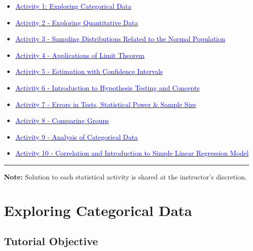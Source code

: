 \documentclass[oneside,openany]{book}
\providecommand{\tightlist}{%
  \setlength{\itemsep}{0pt}\setlength{\parskip}{0pt}}
\begin{document}
\begin{itemize}
\tightlist
\item
  \hyperref[activity-1---exploring-categorical-data]{\textcolor{blue}{Activity 1: Exploring Categorical Data}}
\item
  \hyperref[activity-2---exploring-quantitative-data]{\textcolor{blue}{Activity 2 - Exploring Quantitative Data}}
\item
  \hyperref[activity-3---sampling-distributions-related-to-the-normal-population]{\textcolor{blue}{Activity 3 - Sampling Distributions Related to the Normal Population}}
\item
  \hyperref[activity-4---applications-of-limit-theorem]{\textcolor{blue}{Activity 4 - Applications of Limit Theorem}}
\item
  \hyperref[activity-5---estimation-with-confidence-intervals]{\textcolor{blue}{Activity 5 - Estimation with Confidence Intervals}}
\item
  \hyperref[activity-6---introduction-to-hypothesis-testing-and-concepts]{\textcolor{blue}{Activity 6 - Introduction to Hypothesis Testing and Concepts}}
\item
  \hyperref[activity-7---errors-in-tests-statistical-power--sample-size]{\textcolor{blue}{Activity 7 - Errors in Tests, Statistical Power \& Sample Size}}
\item
  \hyperref[activity-8---comparing-groups]{\textcolor{blue}{Activity 8 - Comparing Groups}}
\item
  \hyperref[activity-9---analysis-of-categorical-data]{\textcolor{blue}{Activity 9 - Analysis of Categorical Data}}
\item
  \hyperref[activity-10---correlation-and-introduction-to-simple-linear-regression-model]{\textcolor{blue}{Activity 10 - Correlation and Introduction to Simple Linear Regression Model}}
\end{itemize}


\begin{center}\rule{0.5\linewidth}{0.5pt}\end{center}

\textbf{Note:} Solution to each statistical activity is shared at the instructor's discretion.

\chapter{Exploring Categorical Data}\label{activity-1---exploring-categorical-data}

\section{Tutorial Objective}
\end{document}
